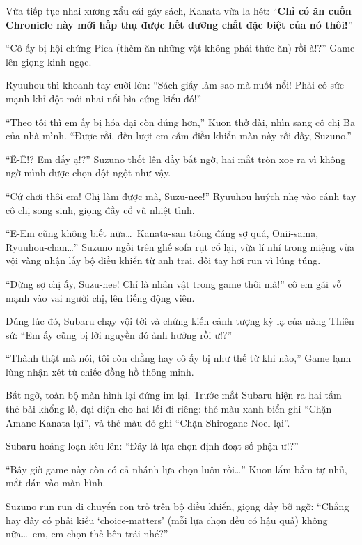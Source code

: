 \documentclass[../main.tex]{subfiles}
\begin{document}
Vừa tiếp tục nhai xương xẩu cái gáy sách, Kanata vừa la hét: ``\textbf{Chỉ có ăn cuốn Chronicle này mới hấp thụ được hết dưỡng chất đặc biệt của nó thôi!}''

``Cô ấy bị hội chứng Pica (thèm ăn những vật không phải thức ăn) rồi à!?'' Game lên giọng kinh ngạc.

Ryuuhou thì khoanh tay cười lớn: ``Sách giấy làm sao mà nuốt nổi! Phải có sức mạnh khỉ đột mới nhai nổi bìa cứng kiểu đó!''

``Theo tôi thì em ấy bị hóa dại còn đúng hơn,'' Kuon thở dài, nhìn sang cô chị Ba của nhà mình. ``Được rồi, đến lượt em cầm điều khiển màn này rồi đấy, Suzuno.''

``Ê-Ê!? Em đấy ạ!?'' Suzuno thốt lên đầy bất ngờ, hai mắt tròn xoe ra vì không ngờ mình được chọn đột ngột như vậy.

``Cứ chơi thôi em! Chị làm được mà, Suzu-nee!'' Ryuuhou huých nhẹ vào cánh tay cô chị song sinh, giọng đầy cổ vũ nhiệt tình.

``E-Em cũng không biết nữa\dots\ Kanata-san trông đáng sợ quá, Onii-sama, Ryuuhou-chan\dots'' Suzuno ngồi trên ghế sofa rụt cổ lại, vừa lí nhí trong miệng vừa vội vàng nhận lấy bộ điều khiển từ anh trai, đôi tay hơi run vì lúng túng.

``Đừng sợ chị ấy, Suzu-nee! Chỉ là nhân vật trong game thôi mà!'' cô em gái vỗ mạnh vào vai người chị, lên tiếng động viên.

Đúng lúc đó, Subaru chạy vội tới và chứng kiến cảnh tượng kỳ lạ của nàng Thiên sứ: ``Em ấy cũng bị lời nguyền đó ảnh hưởng rồi ư!?''

``Thành thật mà nói, tôi còn chẳng hay cô ấy bị như thế từ khi nào,'' Game lạnh lùng nhận xét từ chiếc đồng hồ thông minh.

Bất ngờ, toàn bộ màn hình lại đứng im lại. Trước mắt Subaru hiện ra hai tấm thẻ bài khổng lồ, đại diện cho hai lối đi riêng: thẻ màu xanh biển ghi ``Chặn Amane Kanata lại'', và thẻ màu đỏ ghi ``Chặn Shirogane Noel lại''.


Subaru hoảng loạn kêu lên: ``Đây là lựa chọn định đoạt số phận ư!?''

``Bây giờ game này còn có cả nhánh lựa chọn luôn rồi\dots'' Kuon lẩm bẩm tự nhủ, mắt dán vào màn hình.

Suzuno run run di chuyển con trỏ trên bộ điều khiển, giọng đầy bỡ ngỡ: ``Chẳng hay đây có phải kiểu `choice-matters' (mỗi lựa chọn đều có hậu quả) không nữa\dots\ em, em chọn thẻ bên trái nhé?''
\end{document}
